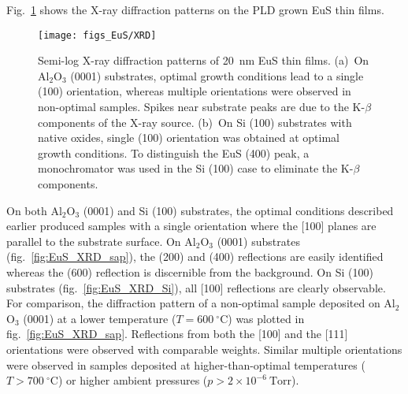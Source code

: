 Fig.~\ref{fig:EuS_XRD} shows the X-ray diffraction patterns on the PLD grown EuS thin films. %
\begin{figure}[ht]%
\subfloat{\label{fig:EuS_XRD_sap}}%
\subfloat{\label{fig:EuS_XRD_Si}}%
\centering%
\texttt{[image: figs\_EuS/XRD]}%
\caption[X-ray diffraction patterns of EuS thin films]{Semi-log X-ray diffraction patterns of 20~nm EuS thin films. (a)~On Al$_2$O$_3$ (0001) substrates, optimal growth conditions lead to a single (100) orientation, whereas multiple orientations were observed in non-optimal samples. Spikes near substrate peaks are due to the K-$\beta$ components of the X-ray source. (b)~On Si (100) substrates with native oxides, single (100) orientation was obtained at optimal growth conditions. To distinguish the EuS (400) peak, a monochromator was used in the Si (100) case to eliminate the K-$\beta$ components.}%
\label{fig:EuS_XRD}%
\end{figure}%
%
On both Al$_2$O$_3$ (0001) and Si (100) substrates, the optimal conditions described earlier produced samples with a single orientation where the [100] planes are parallel to the substrate surface. On Al$_2$O$_3$ (0001) substrates (fig.~\ref{fig:EuS_XRD_sap}), the (200) and (400) reflections are easily identified whereas the (600) reflection is discernible from the background. On Si (100) substrates (fig.~\ref{fig:EuS_XRD_Si}), all [100] reflections are clearly observable. For comparison, the diffraction pattern of a non-optimal sample deposited on Al$_2$O$_3$ (0001) at a lower temperature ($T=600~^{\circ}\mathrm{C}$) was plotted in fig.~\ref{fig:EuS_XRD_sap}. Reflections from both the [100] and the [111] orientations were observed with comparable weights. Similar multiple orientations were observed in samples deposited at higher-than-optimal temperatures ($T>700~^{\circ}\mathrm{C}$) or higher ambient pressures ($p>2\times{}10^{-6}~\mathrm{Torr}$).

